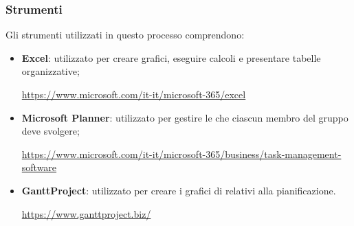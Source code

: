 \subsubsection{Strumenti}
Gli strumenti utilizzati in questo processo comprendono:
\begin{itemize}
	\item \textbf{Excel}: utilizzato per creare grafici, eseguire calcoli e presentare tabelle organizzative; 
	\begin{center}
		\textcolor{blue}{\url{https://www.microsoft.com/it-it/microsoft-365/excel}}
	\end{center}
	\item \textbf{Microsoft Planner}: utilizzato per gestire le  che ciascun membro del gruppo deve svolgere; 
	\begin{center}
		\textcolor{blue}{\url{https://www.microsoft.com/it-it/microsoft-365/business/task-management-software}}
	\end{center}
	\item \textbf{GanttProject}: utilizzato per creare i grafici di  relativi alla pianificazione.
	\begin{center}
		\textcolor{blue}{\url{https://www.ganttproject.biz/}}
	\end{center}
\end{itemize}
